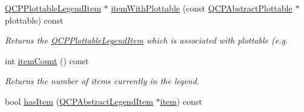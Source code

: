 \begin{DoxyCompactItemize}
\hyperlink{classQCPPlottableLegendItem}{Q\+C\+P\+Plottable\+Legend\+Item} $\ast$ \hyperlink{classQCPLegend_a5ee80cf83f65e3b6dd386942ee3cc1ee}{item\+With\+Plottable} (const \hyperlink{classQCPAbstractPlottable}{Q\+C\+P\+Abstract\+Plottable} $\ast$plottable) const 
\begin{DoxyCompactList}\small\item\em Returns the \hyperlink{classQCPPlottableLegendItem}{Q\+C\+P\+Plottable\+Legend\+Item} which is associated with {\itshape plottable} (e.\+g. \end{DoxyCompactList}\item 
int \hyperlink{classQCPLegend_a198228e9cdc78d3a3c306fa6763d0404}{item\+Count} () const 
\begin{DoxyCompactList}\small\item\em Returns the number of items currently in the legend. \end{DoxyCompactList}\item 
\hypertarget{classQCPLegend_a380dd19eb631592e1ebb9b24cc5b398a}{}bool \hyperlink{classQCPLegend_a380dd19eb631592e1ebb9b24cc5b398a}{has\+Item} (\hyperlink{classQCPAbstractLegendItem}{Q\+C\+P\+Abstract\+Legend\+Item} $\ast$\hyperlink{classQCPLegend_a454272d7094437beb3278a2294006da5}{item}) const \label{classQCPLegend_a380dd19eb631592e1ebb9b24cc5b398a}


\end{DoxyCompactItemize}
